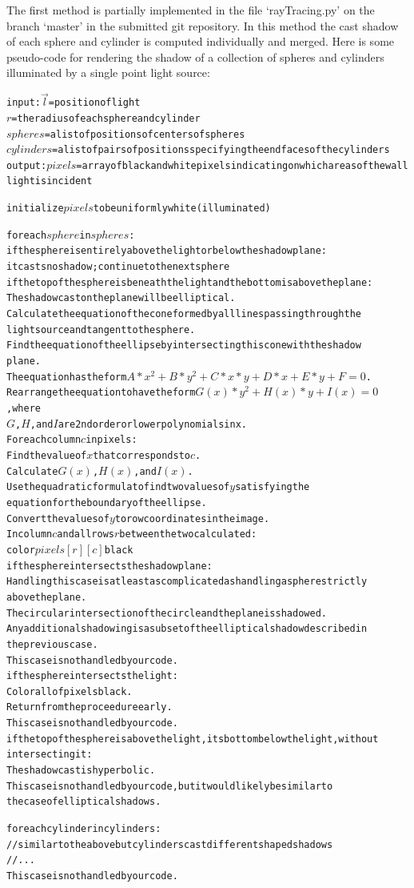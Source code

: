 \documentclass[10pt]{article}
\begin{document}
The first method is partially implemented in the file `rayTracing.py' on the branch `master' in the submitted git repository. In this method the cast shadow of each sphere and cylinder is computed individually and merged. Here is some pseudo-code for rendering the shadow of a collection of spheres and cylinders illuminated by a single point light source:

\begin{alltt}
input: \(\vec{l}\) = position of light
       \(r\) = the radius of each sphere and cylinder
       \(spheres\) = a list of positions of centers of spheres
       \(cylinders\) = a list of pairs of positions specifying the end faces of the cylinders
output: \(pixels\) = array of black and white pixels indicating on which areas of the wall
              light is incident

initialize \(pixels\) to be uniformly white (illuminated)

for each \(sphere\) in \(spheres\):
  if the sphere is entirely above the light or below the shadow plane:
    it casts no shadow; continue to the next sphere
  if the top of the sphere is beneath the light and the bottom is above the plane:
    The shadow cast on the plane will be elliptical.
    Calculate the equation of the cone formed by all lines passing through the
        light source and tangent to the sphere.
    Find the equation of the ellipse by intersecting this cone with the shadow
        plane.
    The equation has the form \(A*x^2 + B*y^2 + C*x*y + D*x + E*y + F = 0\).
    Rearrange the equation to have the form \(G(x)*y^2 + H(x)*y + I(x) = 0\), where
        \(G\), \(H\), and \(I\) are 2nd order or lower polynomials in x.
    For each column \(c\) in pixels:
      Find the value of \(x\) that corresponds to \(c\).
      Calculate \(G(x)\), \(H(x)\), and \(I(x)\).
      Use the quadratic formula to find two values of \(y\) satisfying the
          equation for the boundary of the ellipse.
      Convert the values of \(y\) to row coordinates in the image.
      In column \(c\) and all rows \(r\) between the two calculated:
        color \(pixels[r][c]\) black
  if the sphere intersects the shadow plane:
    Handling this case is at least as complicated as handling a sphere strictly
        above the plane.
    The circular intersection of the circle and the plane is shadowed.
    Any additional shadowing is a subset of the elliptical shadow described in
        the previous case.
    This case is not handled by our code.
  if the sphere intersects the light:
    Color all of pixels black.
    Return from the proceedure early.
    This case is not handled by our code.
  if the top of the sphere is above the light, its bottom below the light, without
      intersecting it:
    The shadow cast is hyperbolic.
    This case is not handled by our code, but it would likely be similar to
        the case of elliptical shadows.

for each cylinder in cylinders:
  //similar to the above but cylinders cast different shaped shadows
  // ...
  This case is not handled by our code.
\end{alltt}
\end{document}
